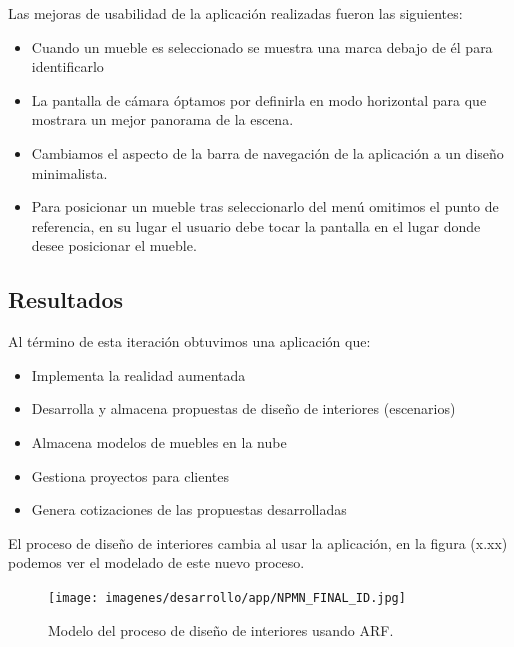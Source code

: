 Las mejoras de usabilidad de la aplicación realizadas fueron las siguientes:
\begin{itemize}
	\item Cuando un mueble es seleccionado se muestra una marca debajo de él para identificarlo
	\item La pantalla de cámara óptamos por definirla en modo horizontal para que mostrara un mejor panorama de la escena.
	\item Cambiamos el aspecto de la barra de navegación de la aplicación a un diseño minimalista.
	\item Para posicionar un mueble tras seleccionarlo del menú omitimos el punto de referencia, en su lugar el usuario debe tocar la pantalla en el lugar donde desee posicionar el mueble.
\end{itemize}

\subsection{Resultados}
Al término de esta iteración obtuvimos una aplicación que:
\begin{itemize}
	\item Implementa la realidad aumentada
	\item Desarrolla y almacena propuestas de diseño de interiores (escenarios)
	\item Almacena modelos de muebles en la nube
	\item Gestiona proyectos para clientes
	\item Genera cotizaciones de las propuestas desarrolladas
\end{itemize}

El proceso de diseño de interiores cambia al usar la aplicación, en la figura (x.xx) podemos ver el modelado de este nuevo proceso.
\begin{figure}[!htbp]
	\centering
	\texttt{[image: imagenes/desarrollo/app/NPMN\_FINAL\_ID.jpg]}
	\caption{Modelo del proceso de diseño de interiores usando ARF.}
	\label{fig:bpmnarf}
\end{figure}